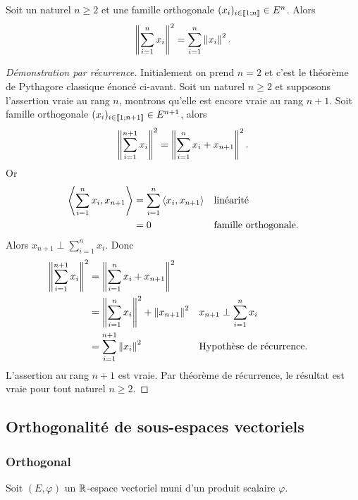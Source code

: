 \begin{theo}
  Soit un naturel $n\geqslant 2$ et une famille orthogonale $(x_i)_{i \in \mathopen{\llbracket}1\mathclose{}\mathpunct{};n\mathclose{\rrbracket}} \in E^n$. Alors
  \begin{equation}
    \left\lVert\sum_{i=1}^nx_i\right\rVert^2 = \sum_{i=1}^n \left\lVert x_i\right\rVert^2.
  \end{equation}
\end{theo}
\begin{proof}[Démonstration par récurrence]
  Initialement on prend $n=2$ et c'est le théorème de Pythagore classique énoncé ci-avant. Soit un naturel $n \ge 2$ et supposons l'assertion vraie au rang $n$, montrons qu'elle est encore vraie au rang $n+1$. Soit famille orthogonale $(x_i)_{i \in \mathopen{\llbracket}1\mathclose{}\mathpunct{};n+1\mathclose{\rrbracket}} \in E^{n+1}$, alors
  \begin{equation}
    \left\lVert\sum_{i=1}^{n+1}x_i\right\rVert^2 =  \left\lVert\sum_{i=1}^{n}x_i+x_{n+1}\right\rVert^2.
  \end{equation}
  Or
  \begin{align}
    \left\langle{\sum_{i=1}^{n}x_i},{x_{n+1}}\right\rangle &=\sum_{i=1}^{n}\left\langle{x_i},{x_{n+1}}\right\rangle && \text{linéarité} \\
    &=0 && \text{famille orthogonale}.
  \end{align}
  Alors $x_{n+1} \perp \sum_{i=1}^n x_i$. Donc
  \begin{align}
    \left\lVert\sum_{i=1}^{n+1}x_i\right\rVert^2 &=  \left\lVert\sum_{i=1}^{n}x_i+x_{n+1}\right\rVert^2 \\
    &=\left\lVert\sum_{i=1}^{n}x_i\right\rVert^2 + \left\lVert x_{n+1}\right\rVert^2 && x_{n+1} \perp \sum_{i=1}^n x_i \\
    &=\sum_{i=1}^{n+1}\left\lVert x_i\right\rVert^2 &&  \text{Hypothèse de récurrence}.
  \end{align}
  L'assertion au rang $n+1$ est vraie. Par théorème de récurrence, le résultat est vraie pour tout naturel $n \geqslant 2$.
\end{proof}

\subsection{Orthogonalité de sous-espaces vectoriels}

\subsubsection{Orthogonal}

Soit $(E,\varphi)$ un $\mathbb{R}$-espace vectoriel muni d'un produit scalaire $\varphi$.

